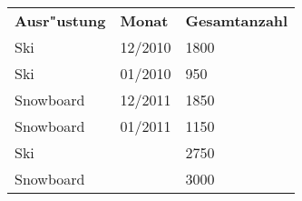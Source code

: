\bigskip

\begin{tabular}{ l l l }
    \rowcolor{LightSlateGray}
    \textbf{Ausr"ustung} & \textbf{Monat} & \textbf{Gesamtanzahl}\\
    Ski         & 12/2010   & 1800\\
    Ski         & 01/2010   & 950\\
    Snowboard   & 12/2011   & 1850\\
    Snowboard   & 01/2011   & 1150\\
    Ski         &           & 2750\\
    Snowboard   &           & 3000\\
\end{tabular}

